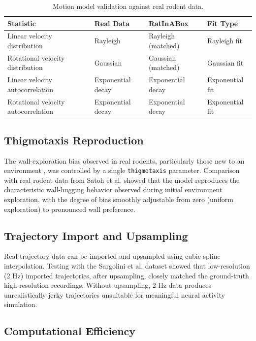 \documentclass[12pt]{article}
\begin{document}
\begin{table}[htbp]
\centering
\caption{Motion model validation against real rodent data.}
\label{tab:validation}
\begin{tabular}{llll}
\toprule
Statistic & Real Data & RatInABox & Fit Type \\
\midrule
Linear velocity distribution & Rayleigh & Rayleigh (matched) & Rayleigh fit \\
Rotational velocity distribution & Gaussian & Gaussian (matched) & Gaussian fit \\
Linear velocity autocorrelation & Exponential decay & Exponential decay & Exponential fit \\
Rotational velocity autocorrelation & Exponential decay & Exponential decay & Exponential fit \\
\bottomrule
\end{tabular}
\end{table}

\subsection{Thigmotaxis Reproduction}

The wall-exploration bias observed in real rodents, particularly those new to an environment \citep{satoh2006postnatal}, was controlled by a single \texttt{thigmotaxis} parameter. Comparison with real rodent data from Satoh et al. showed that the model reproduces the characteristic wall-hugging behavior observed during initial environment exploration, with the degree of bias smoothly adjustable from zero (uniform exploration) to pronounced wall preference.

\subsection{Trajectory Import and Upsampling}

Real trajectory data can be imported and upsampled using cubic spline interpolation. Testing with the Sargolini et al. dataset showed that low-resolution (2 Hz) imported trajectories, after upsampling, closely matched the ground-truth high-resolution recordings. Without upsampling, 2 Hz data produces unrealistically jerky trajectories unsuitable for meaningful neural activity simulation.

\subsection{Computational Efficiency}
\end{document}
